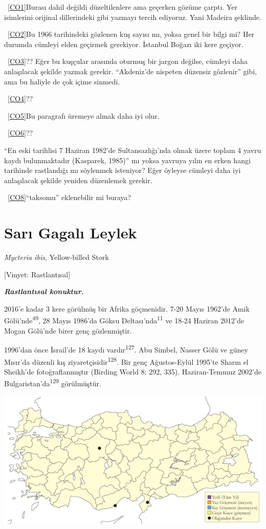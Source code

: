\documentclass[
  letterpaper,
  DIV=11,
  numbers=noendperiod]{scrreprt}
\begin{document}
~\hyperref[_msoanchor_1]{{[}CO1{]}}Burası dahil değildi düzeltilenlere
ama geçerken gözüme çarptı. Yer isimlerini orijinal dillerindeki gibi
yazmayı tercih ediyoruz. Yani Madeira şeklinde.

~\hyperref[_msoanchor_2]{{[}CO2{]}}Bu 1966 tarihindeki gözlenen kuş
sayısı mı, yoksa genel bir bilgi mi? Her durumda cümleyi elden geçirmek
gerekiyor. İstanbul Boğazı iki kere geçiyor.

~\hyperref[_msoanchor_3]{{[}CO3{]}}?? Eğer bu kuşçular arasında oturmuş
bir jargon değilse, cümleyi daha anlaşılacak şekilde yazmak gerekir.
``Akdeniz'de nispeten düzensiz gözlenir'' gibi, ama bu haliyle de çok
içime sinmedi.

~\hyperref[_msoanchor_4]{{[}CO4{]}}??

~\hyperref[_msoanchor_5]{{[}CO5{]}}Bu paragrafı üremeye almak daha iyi
olur.

~\hyperref[_msoanchor_6]{{[}CO6{]}}??

``En eski tarihlisi 7 Haziran 1982'de Sultansazlığı'nda olmak üzere
toplam 4 yavru kaydı bulunmaktadır (Kasparek, 1985)'' mı yoksa yavruya
yılın en erken hangi tarihinde rastlandığı mı söylenmek isteniyor? Eğer
öyleyse cümleyi daha iyi anlaşılacak şekilde yeniden düzenlemek gerekir.

~\hyperref[_msoanchor_8]{{[}CO8{]}}``taksomu'' eklenebilir mi buraya?

\section{Sarı Gagalı Leylek}\label{sarux131-gagalux131-leylek}

\emph{Mycteria ibis}, Yellow-billed Stork

{[}Vinyet: Rastlantısal{]}

\textbf{\emph{Rastlantısal konuktur.}}

2016'e kadar 3 kere görülmüş bir Afrika göçmenidir. 7-20 Mayıs 1962'de
Amik Gölü'nde\textsuperscript{49}, 28 Mayıs 1986'da Göksu
Deltası'nda\textsuperscript{11} ve 18-24 Haziran 2012'de Mogan Gölü'nde
birer genç gözlenmiştir.

1996'dan önce İsrail'de 18 kaydı vardır\textsuperscript{127}. Abu
Simbel, Nasser Gölü ve güney Mısır'da düzenli kış
ziyaretçisidir\textsuperscript{128}. Bir genç Ağustos-Eylül 1995'te
Sharm el Sheikh'de fotoğraflanmıştır (Birding World 8: 292, 335).
Haziran-Temmuz 2002'de Bulgaristan'da\textsuperscript{129} görülmüştür.

\includegraphics{images/harita_Page_058.png}
\end{document}
